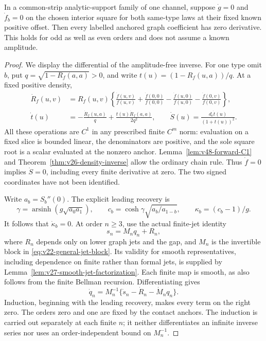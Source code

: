 \begin{lemma}
\label{lem:v48-local-kernel}
In a common-strip analytic-support family of one channel, suppose
$\dot g=0$ and $\dot f_b=0$ on the chosen interior square for both
same-type laws at their fixed known positive offset.  Then every
labelled anchored graph coefficient has zero derivative.  This holds
for odd as well as even orders and does not assume a known amplitude.
\end{lemma}

\begin{proof}
We display the differential of the amplitude-free inverse.  For one
type omit $b$, put $q=\sqrt{1-R_f(a,a)}>0$, and write
$t(u)=(1-R_f(u,a))/q$.  At a fixed positive density,
\begin{align}
 \dot R_f(u,v)&=R_f(u,v)\left\{
    \frac{\dot f(u,v)}{f(u,v)}+\frac{\dot f(0,0)}{f(0,0)}
   -\frac{\dot f(u,0)}{f(u,0)}-\frac{\dot f(0,v)}{f(0,v)}\right\},
                         \label{eq:v48-ratio-differential}\\
 \dot t(u)&=-\frac{\dot R_f(u,a)}q
                   +\frac{t(u)\dot R_f(a,a)}{2q^2},\qquad
 \dot S(u)=\frac{d_e\dot t(u)}{(1+t(u))^2}.
                         \label{eq:v48-action-differential}
\end{align}
All these operations are $C^1$ in any prescribed finite $C^m$ norm:
evaluation on a fixed slice is bounded linear, the denominators are
positive, and the sole square root is a scalar evaluated at the nonzero
anchor.  Lemma~\ref{lem:v48-forward-C1} and
Theorem~\ref{thm:v26-density-inverse} allow the ordinary chain rule.
Thus $\dot f=0$ implies $\dot S=0$, including every finite derivative
at zero.  The two signed coordinates have not been identified.

Write $a_b=S_b''(0)$.  The explicit leading recovery is
\[
 \gamma=\operatorname{arsinh}(g\sqrt{a_0a_1}),\qquad
 c_b=\cosh\gamma\sqrt{a_b/a_{1-b}},\qquad
 \kappa_b=(c_b-1)/g.
\]
It follows that $\dot\kappa_b=0$.  At order $n\ge3$, use the actual
finite-jet identity
\[
             s_n=M_nq_n+R_n,
\]
where $R_n$ depends only on lower graph jets and the gap, and $M_n$ is
the invertible block in \eqref{eq:v22-general-jet-block}.  Its validity
for smooth representatives, including dependence on finite rather than
formal jets, is supplied by
Lemma~\ref{lem:v27-smooth-jet-factorization}.  Each finite map is smooth,
as also follows from the finite Bellman recursion.  Differentiating gives
\begin{equation}\label{eq:v48-jet-differential}
       \dot q_n=M_n^{-1}\{\dot s_n-\dot R_n-\dot M_nq_n\}.
\end{equation}
Induction, beginning with the leading recovery, makes every term on
the right zero.  The orders zero and one are fixed by the contact
anchors.  The induction is carried out separately at each finite
$n$; it neither differentiates an infinite inverse series nor uses an
order-independent bound on $M_n^{-1}$.
\end{proof}

